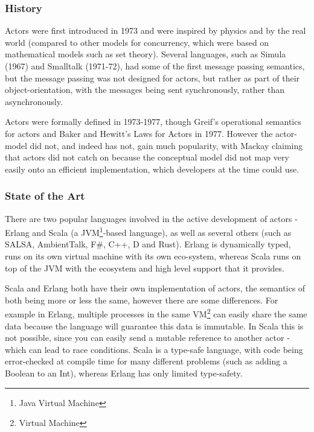 \documentclass{article}
\begin{document}
\subsubsection{History}

Actors were first introduced in 1973\cite{hewitt1973} and were inspired by physics and by the real world\cite{hewitt2006} (compared to other models for concurrency, which were based on mathematical models such as set theory\cite{Milner:1993:EIT:151233.151240}).
Several languages, such as Simula (1967) and Smalltalk (1971-72), had some of the first message passing semantics, but the message passing was not designed for actors, but rather as part of their object-orientation, with the messages being sent synchronously, rather than asynchronously.

Actors were formally defined in 1973-1977, though Greif's operational semantics for actors\cite{grief1975} and Baker and Hewitt's Laws for Actors in 1977\cite{hewitt1977}.
However the actor-model did not, and indeed has not, gain much popularity, with Mackay\cite{mackay97} claiming that actors did not catch on because the conceptual model did not map very easily onto an efficient implementation, which developers at the time could use.

\subsubsection{State of the Art}

There are two popular languages involved in the active development of actors - Erlang and Scala (a JVM\footnote{Java Virtual Machine}-based language), as well as several others (such as SALSA, AmbientTalk, F\#, C++, D and Rust).
Erlang is dynamically typed, runs on its own virtual machine with its own eco-system, whereas Scala runs on top of the JVM with the ecosystem and high level support that it provides.

Scala and Erlang both have their own implementation of actors, the semantics of both being more or less the same, however there are some differences. 
For example in Erlang, multiple processes in the same VM\footnote{Virtual Machine} can easily share the same data because the language will guarantee this data is immutable.
In Scala this is not possible, since you can easily send a mutable reference to another actor - which can lead to race conditions\cite{akka-mutable}.
Scala is a type-safe language, with code being error-checked at compile time for many different problems (such as adding a Boolean to an Int), whereas Erlang has only limited type-safety.
\end{document}
